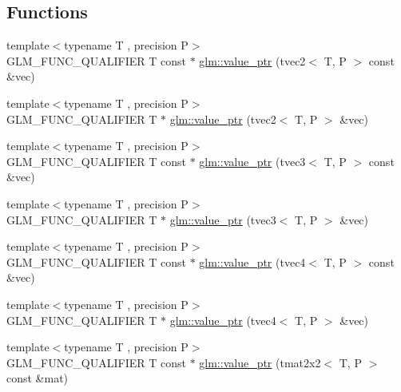 \subsection*{Functions}
\begin{DoxyCompactItemize}
\item 
{\footnotesize template$<$typename T , precision P$>$ }\\G\+L\+M\+\_\+\+F\+U\+N\+C\+\_\+\+Q\+U\+A\+L\+I\+F\+I\+E\+R T const $\ast$ \hyperlink{group__gtc__type__ptr_gafb01331238d8899dde700cb9b5dc6ef3}{glm\+::value\+\_\+ptr} (tvec2$<$ T, P $>$ const \&vec)
\item 
{\footnotesize template$<$typename T , precision P$>$ }\\G\+L\+M\+\_\+\+F\+U\+N\+C\+\_\+\+Q\+U\+A\+L\+I\+F\+I\+E\+R T $\ast$ \hyperlink{group__gtc__type__ptr_gabd3cc713184a2093862605f5f0abb8a4}{glm\+::value\+\_\+ptr} (tvec2$<$ T, P $>$ \&vec)
\item 
{\footnotesize template$<$typename T , precision P$>$ }\\G\+L\+M\+\_\+\+F\+U\+N\+C\+\_\+\+Q\+U\+A\+L\+I\+F\+I\+E\+R T const $\ast$ \hyperlink{group__gtc__type__ptr_gac04db5d9c05bd3d50140f34f8695a08c}{glm\+::value\+\_\+ptr} (tvec3$<$ T, P $>$ const \&vec)
\item 
{\footnotesize template$<$typename T , precision P$>$ }\\G\+L\+M\+\_\+\+F\+U\+N\+C\+\_\+\+Q\+U\+A\+L\+I\+F\+I\+E\+R T $\ast$ \hyperlink{group__gtc__type__ptr_gab2832ef9f1d2571fab5c7ae661e11e75}{glm\+::value\+\_\+ptr} (tvec3$<$ T, P $>$ \&vec)
\item 
{\footnotesize template$<$typename T , precision P$>$ }\\G\+L\+M\+\_\+\+F\+U\+N\+C\+\_\+\+Q\+U\+A\+L\+I\+F\+I\+E\+R T const $\ast$ \hyperlink{group__gtc__type__ptr_gaf641bc0e28d4b274826b9afed315d310}{glm\+::value\+\_\+ptr} (tvec4$<$ T, P $>$ const \&vec)
\item 
{\footnotesize template$<$typename T , precision P$>$ }\\G\+L\+M\+\_\+\+F\+U\+N\+C\+\_\+\+Q\+U\+A\+L\+I\+F\+I\+E\+R T $\ast$ \hyperlink{group__gtc__type__ptr_ga4c19763f3c5991b9dc88a3ffdd9ea6cd}{glm\+::value\+\_\+ptr} (tvec4$<$ T, P $>$ \&vec)
\item 
{\footnotesize template$<$typename T , precision P$>$ }\\G\+L\+M\+\_\+\+F\+U\+N\+C\+\_\+\+Q\+U\+A\+L\+I\+F\+I\+E\+R T const $\ast$ \hyperlink{group__gtc__type__ptr_ga2d709523aa0beb0a42433f80c9d07718}{glm\+::value\+\_\+ptr} (tmat2x2$<$ T, P $>$ const \&mat)

\end{DoxyCompactItemize}
